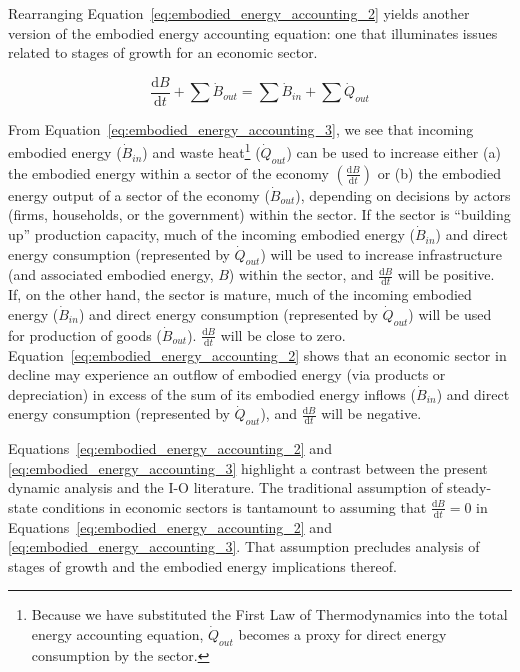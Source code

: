 Rearranging Equation~\ref{eq:embodied_energy_accounting_2}
yields another version of the embodied energy accounting equation:
one that illuminates issues related to 
stages of growth for an economic sector.

\begin{equation} \label{eq:embodied_energy_accounting_3}
	\frac{\mathrm{d}B}{\mathrm{d}t} 
	+ \sum \dot{B}_{out}
	= \sum \dot{B}_{in}
	+ \sum \dot{Q}_{out}
\end{equation}

\noindent From Equation~\ref{eq:embodied_energy_accounting_3},
we see that incoming embodied energy ($\dot{B}_{in}$) and 
waste heat\footnote{Because we have substituted 
the First Law of Thermodynamics into the total energy accounting equation,
$\dot{Q}_{out}$ becomes a proxy for direct energy consumption by the sector.} 
($\dot{Q}_{out}$) can be used to increase either (a)
the embodied energy within a sector of the economy 
$\left( \frac{\mathrm{d}B}{\mathrm{d}t}  \right)$
or (b) the embodied energy output of a sector of the economy 
($\dot{B}_{out}$), 
depending on decisions by actors 
(firms, households, or the government) 
within the sector. 
If the sector is ``building up'' production capacity, 
much of the incoming embodied energy ($\dot{B}_{in}$)
and direct energy consumption (represented by $\dot{Q}_{out}$)
will be used to increase infrastructure 
(and associated embodied energy, $B$) within the sector, 
and $\frac{\mathrm{d}B}{\mathrm{d}t}$ will be positive.
If, on the other hand, the sector is mature, 
much of the incoming embodied energy ($\dot{B}_{in}$)
and direct energy consumption (represented by $\dot{Q}_{out}$)
will be used for production of goods ($\dot{B}_{out}$).
$\frac{\mathrm{d}B}{\mathrm{d}t}$ will be close to zero.
Equation~\ref{eq:embodied_energy_accounting_2} shows that
an economic sector in decline may experience an outflow 
of embodied energy (via products or depreciation)
in excess of the sum of 
its embodied energy inflows ($\dot{B}_{in}$)
and direct energy consumption (represented by $\dot{Q}_{out}$),
and $\frac{\mathrm{d}B}{\mathrm{d}t}$ will be negative.

Equations~\ref{eq:embodied_energy_accounting_2}
and \ref{eq:embodied_energy_accounting_3} 
highlight a contrast between 
the present dynamic analysis and the I-O literature.
The traditional assumption of steady-state conditions 
in economic sectors is tantamount to assuming that
$\frac{\mathrm{d}B}{\mathrm{d}t} = 0$ in 
Equations~\ref{eq:embodied_energy_accounting_2}
and \ref{eq:embodied_energy_accounting_3}.
That assumption precludes analysis of stages of growth 
and the embodied energy implications thereof.

